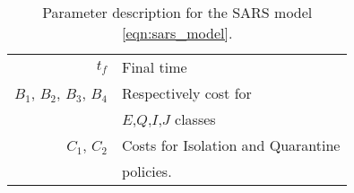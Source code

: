 \begin{table}[htb]
\begin{center}
\begin{tabular}{@{}rl@{}}
        \\
        $t_f$
          & Final time 
        \\
        $B_1$, $B_2$, $B_3$, $B_4$
        & Respectively cost for 
        \\
        &
          $E$,$Q$,$I$,$J$ classes
        \\
        $C_1$, $C_2$
        & Costs for Isolation and Quarantine 
        \\
          & policies.
        \\
        \bottomrule
      \end{tabular}
     \caption{Parameter description for the SARS model
     \eqref{eqn:sars_model}.}
     \label{tbl:sars_table}
     \end{center}
\end{table}